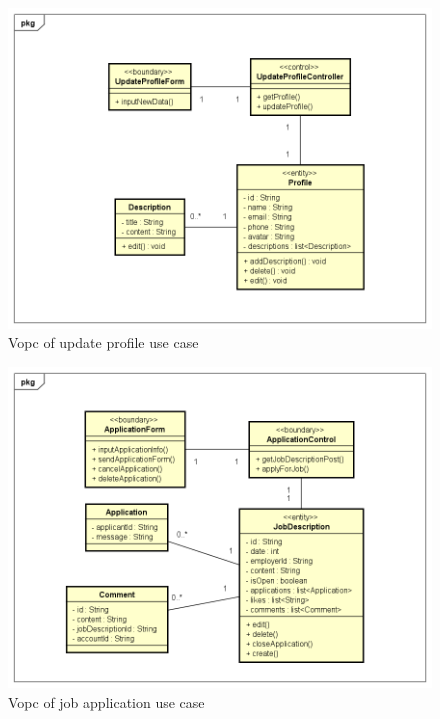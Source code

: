 \documentclass[a4paper]{article}
\begin{document}
    \begin{figure}[H]
        \centering
        \includegraphics[width=1.0\textwidth]{vopc_update_profile.png}
        \caption{Vopc of update profile use case}
        \label{fig:fig24}
    \end{figure}

    \begin{figure}[H]
        \centering
        \includegraphics[width=1.0\textwidth]{vopc_job_application.png}
        \caption{Vopc of job application use case}
        \label{fig:fig25}
    \end{figure}
\end{document}

